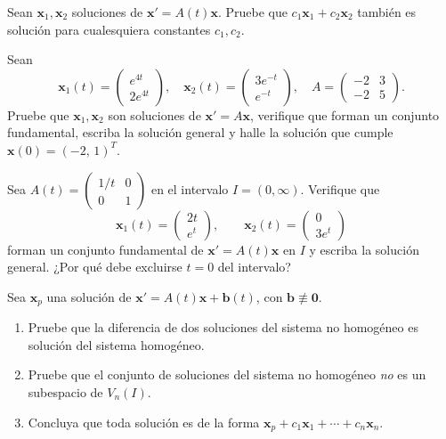 \begin{exercise}[\est{1}]\label{ex:D2}
Sean $\mathbf{x}_1,\mathbf{x}_2$ soluciones de $\mathbf{x}' = A(t)\mathbf{x}$. Pruebe que $c_1\mathbf{x}_1 + c_2\mathbf{x}_2$ también es solución para cualesquiera constantes $c_1,c_2$.
\end{exercise}

\begin{exercise}[\est{2}]\label{ex:D3}
Sean
\[
\mathbf{x}_1(t) = \begin{pmatrix} e^{4t}\\ 2e^{4t}\end{pmatrix}, \quad \mathbf{x}_2(t) = \begin{pmatrix} 3e^{-t}\\ e^{-t}\end{pmatrix}, \quad A = \begin{pmatrix} -2 & 3\\ -2 & 5\end{pmatrix}.
\]
Pruebe que $\mathbf{x}_1,\mathbf{x}_2$ son soluciones de $\mathbf{x}' = A\mathbf{x}$, verifique que forman un conjunto fundamental, escriba la solución general y halle la solución que cumple $\mathbf{x}(0) = (-2,\,1)^T$.
\end{exercise}

\begin{exercise}[\est{2}]\label{ex:D4}
Sea $A(t) = \begin{pmatrix} 1/t & 0\\ 0 & 1\end{pmatrix}$ en el intervalo $I = (0,\infty)$. Verifique que
\[
\mathbf{x}_1(t) = \begin{pmatrix} 2t\\ e^t\end{pmatrix}, \qquad \mathbf{x}_2(t) = \begin{pmatrix} 0\\ 3e^t\end{pmatrix}
\]
forman un conjunto fundamental de $\mathbf{x}' = A(t)\mathbf{x}$ en $I$ y escriba la solución general. ¿Por qué debe excluirse $t = 0$ del intervalo?
\end{exercise}

\begin{exercise}[\est{2}]\label{ex:D5}
Sea $\mathbf{x}_p$ una solución de $\mathbf{x}' = A(t)\mathbf{x} + \mathbf{b}(t)$, con $\mathbf{b} \not\equiv \mathbf{0}$.
\begin{enumerate}[a]
    \item Pruebe que la diferencia de dos soluciones del sistema no homogéneo es solución del sistema homogéneo.
    \item Pruebe que el conjunto de soluciones del sistema no homogéneo \emph{no} es un subespacio de $V_n(I)$.
    \item Concluya que toda solución es de la forma $\mathbf{x}_p + c_1\mathbf{x}_1 + \cdots + c_n\mathbf{x}_n$.
\end{enumerate}
\end{exercise}

